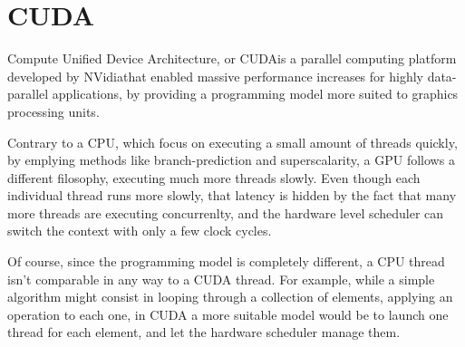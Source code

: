 \section{CUDA}
\label{sec:cuda}


Compute Unified Device Architecture, or CUDA\tm is a parallel computing platform developed by NVidia\tr that enabled massive performance increases for highly data-parallel applications, by providing a programming model more suited to graphics processing units.

Contrary to a CPU, which focus on executing a small amount of threads quickly, by emplying methods like branch-prediction and superscalarity, a GPU follows a different filosophy, executing much more threads slowly. Even though each individual thread runs more slowly, that latency is hidden by the fact that many more threads are executing concurrenlty, and the hardware level scheduler can switch the context with only a few clock cycles.

Of course, since the programming model is completely different, a CPU thread isn't comparable in any way to a CUDA thread. For example, while a simple algorithm might consist in looping through a collection of elements, applying an operation to each one, in CUDA a more suitable model would be to launch one thread for each element, and let the hardware scheduler manage them.



